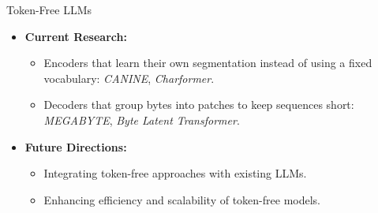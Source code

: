 \begin{frame}{Token-Free LLMs}
  \begin{itemize}
    \item[\textcolor{red}{$\blacktriangleright$}] \textbf{Current Research:}
    \begin{itemize}
      \item Encoders that learn their own segmentation instead of using a fixed vocabulary: \textit{CANINE}, \textit{Charformer}.
      \item Decoders that group bytes into patches to keep sequences short: \textit{MEGABYTE}, \textit{Byte Latent Transformer}.
    \end{itemize}
    \vspace{1em}
    \item[\textcolor{red}{$\blacktriangleright$}] \textbf{Future Directions:}
    \begin{itemize}
      \item Integrating token-free approaches with existing LLMs.
      \item Enhancing efficiency and scalability of token-free models.
    \end{itemize}
  \end{itemize}
\end{frame}
